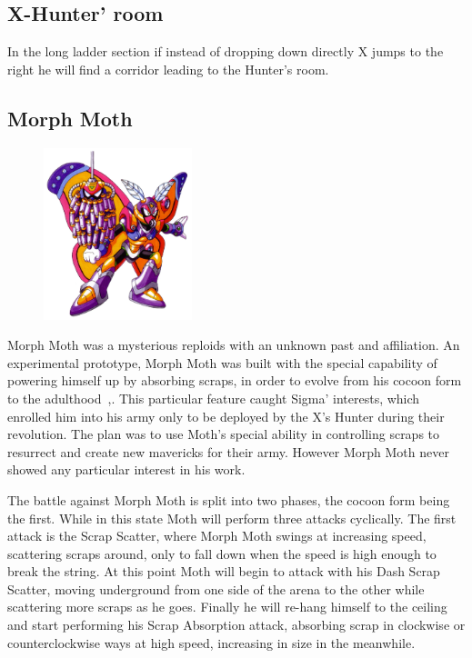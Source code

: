 \subsection{X-Hunter' room}
In the long ladder section if instead of dropping down directly X jumps to the right he will find a corridor leading to the Hunter's room.

\subsection{Morph Moth}\label{boss:Morph_moth}
\begin{figure}[htp]
	\centering
	\includegraphics[height=5cm]{figures/X2/Morph_moth/Morph_Moth.png}
\end{figure}
Morph Moth was a mysterious reploids with an unknown past and affiliation. An experimental prototype, Morph Moth was built with the special capability  of powering himself up by absorbing scraps, in order to evolve from his cocoon form to the adulthood~\cite{wiki:Morph_moth},\cite{wayback:X2_resources}. This particular feature caught Sigma' interests, which enrolled him into his army only to be deployed by the X's Hunter during their revolution. The plan was to use Moth's special ability in controlling scraps to resurrect and create new mavericks for their army. However Morph Moth never showed any particular interest in his work.

The battle against Morph Moth is split into two phases, the cocoon form being the first. While in this state Moth will perform three attacks cyclically. The first attack is the Scrap Scatter, where Morph Moth swings at increasing speed, scattering scraps around, only to fall down when the speed is high enough to break the string. At this point Moth will begin to attack with his Dash Scrap Scatter, moving underground from one side of the arena to the other while scattering more scraps as he goes. Finally he will re-hang himself to the ceiling and start performing his Scrap Absorption attack, absorbing scrap in clockwise or counterclockwise ways at high speed, increasing in size in the meanwhile. 

